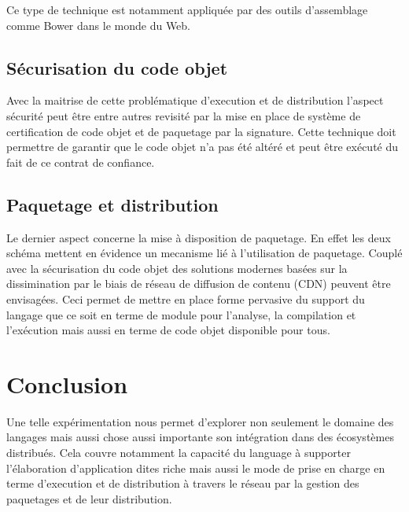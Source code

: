 \documentclass[twoside,a4paper]{article}
\begin{document}
Ce  type  de   technique  est  notamment  appliquée   par  des  outils
d'assemblage comme Bower \cite{bower} dans le monde du Web.

\subsection{Sécurisation du code objet}

Avec la maitrise de cette problématique d'execution et de distribution
l'aspect sécurité peut être entre autres revisité par la mise en place
de  système de  certification de  code objet  et de  paquetage par  la
signature.  Cette technique  doit permettre  de garantir  que le  code
objet n'a pas été altéré et peut être exécuté du fait de ce contrat de
confiance.

\subsection{Paquetage et distribution}

Le  dernier aspect  concerne la  mise à  disposition de  paquetage. En
effet  les  deux  schéma  mettent  en  évidence  un  mecanisme  lié  à
l'utilisation de paquetage.  Couplé avec la sécurisation du code objet
des solutions  modernes basées  sur la dissimination  par le  biais de
réseau de  diffusion de contenu  (CDN) peuvent être  envisagées.  Ceci
permet de mettre en place forme pervasive du support du langage que ce
soit en terme de module  pour l'analyse, la compilation et l'exécution
mais aussi en terme de code objet disponible pour tous.

\section{Conclusion}

Une  telle expérimentation  nous  permet d'explorer  non seulement  le
domaine des langages mais aussi chose aussi importante son intégration
dans des écosystèmes distribués.  Cela couvre notamment la capacité du
language  à supporter  l'élaboration  d'application  dites riche  mais
aussi  le  mode  de  prise  en  charge  en  terme  d'execution  et  de
distribution à travers  le réseau par la gestion des  paquetages et de
leur distribution.



\end{document}
